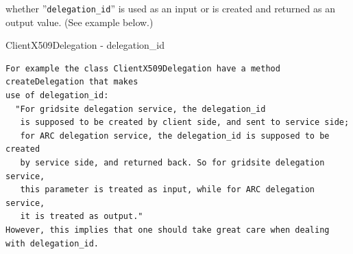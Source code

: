 \documentclass{article}
\begin{document}
\begin{flushleft}
\begin{itemize}
{  whether ''\verb$delegation_id$'' is used as an input or is created and returned as an output value.
  (See example below.)
    \begin{example}
      \caption{ClientX509Delegation - delegation\_id}\label{delegex}
\begin{verbatim}
For example the class ClientX509Delegation have a method createDelegation that makes 
use of delegation_id: 
  "For gridsite delegation service, the delegation_id
   is supposed to be created by client side, and sent to service side;
   for ARC delegation service, the delegation_id is supposed to be created
   by service side, and returned back. So for gridsite delegation service,
   this parameter is treated as input, while for ARC delegation service,
   it is treated as output."
However, this implies that one should take great care when dealing with delegation_id.
\end{verbatim}
    \end{example}
  }
\end{itemize}
\end{flushleft}
\end{document}
